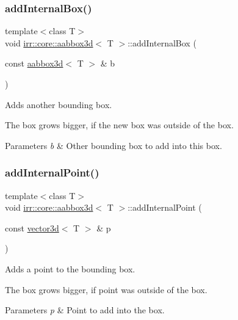 \subsubsection{\texorpdfstring{add\+Internal\+Box()}{addInternalBox()}}
{\footnotesize\ttfamily template$<$class T$>$ \\
void \hyperlink{classirr_1_1core_1_1aabbox3d}{irr\+::core\+::aabbox3d}$<$ T $>$\+::add\+Internal\+Box (\begin{DoxyParamCaption}\item[{const \hyperlink{classirr_1_1core_1_1aabbox3d}{aabbox3d}$<$ T $>$ \&}]{b }\end{DoxyParamCaption})\hspace{0.3cm}{\ttfamily [inline]}}



Adds another bounding box. 

The box grows bigger, if the new box was outside of the box. 
\begin{DoxyParams}{Parameters}
{\em b} & Other bounding box to add into this box. \\
\hline
\end{DoxyParams}
\mbox{\label{classirr_1_1core_1_1aabbox3d_a49e3765fd2f40a115f8f28bd74d62ccf}} 
\subsubsection{\texorpdfstring{add\+Internal\+Point()}{addInternalPoint()}\hspace{0.1cm}{\footnotesize\ttfamily [1/2]}}
{\footnotesize\ttfamily template$<$class T$>$ \\
void \hyperlink{classirr_1_1core_1_1aabbox3d}{irr\+::core\+::aabbox3d}$<$ T $>$\+::add\+Internal\+Point (\begin{DoxyParamCaption}\item[{const \hyperlink{classirr_1_1core_1_1vector3d}{vector3d}$<$ T $>$ \&}]{p }\end{DoxyParamCaption})\hspace{0.3cm}{\ttfamily [inline]}}



Adds a point to the bounding box. 

The box grows bigger, if point was outside of the box. 
\begin{DoxyParams}{Parameters}
{\em p} & Point to add into the box. \\
\hline
\end{DoxyParams}
\mbox{\label{classirr_1_1core_1_1aabbox3d_a123947cb6d77a3e0d6cbb65b63e8b86f}} 
